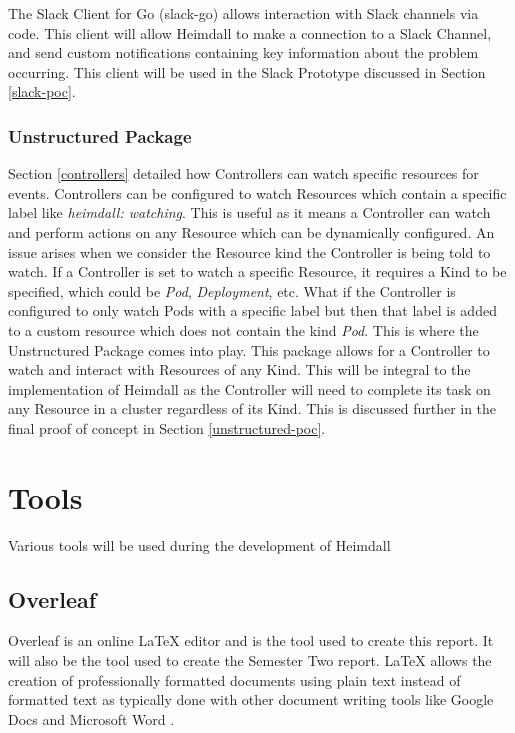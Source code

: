 \documentclass{article}
\begin{document}
The Slack Client for Go (slack-go) allows interaction with Slack channels via code. This client will allow Heimdall to make a connection to a Slack Channel, and send custom notifications containing key information about the problem occurring. This client will be used in the Slack Prototype discussed in Section \ref{slack-poc}.

\subsubsection{Unstructured Package}

Section \ref{controllers} detailed how Controllers can watch specific resources for events. Controllers can be configured to watch Resources which contain a specific label like \emph{heimdall: watching}. This is useful as it means a Controller can watch and perform actions on any Resource which can be dynamically configured. An issue arises when we consider the Resource kind the Controller is being told to watch. If a Controller is set to watch a specific Resource, it requires a Kind to be specified, which could be \emph{Pod}, \emph{Deployment}, etc. What if the Controller is configured to only watch Pods with a specific label but then that label is added to a custom resource which does not contain the kind \emph{Pod}. This is where the Unstructured Package comes into play. This package allows for a Controller to watch and interact with Resources of any Kind. This will be integral to the implementation of Heimdall as the Controller will need to complete its task on any Resource in a cluster regardless of its Kind. This is discussed further in the final proof of concept in Section \ref{unstructured-poc}.



\section{Tools}

Various tools will be used during the development of Heimdall

\subsection{Overleaf}

Overleaf is an online LaTeX editor and is the tool used to create this report. It will also be the tool used to create the Semester Two report. LaTeX allows the creation of professionally formatted documents using plain text instead of formatted text as typically done with other document writing tools like Google Docs and Microsoft Word \cite{overleaf}.
\end{document}
